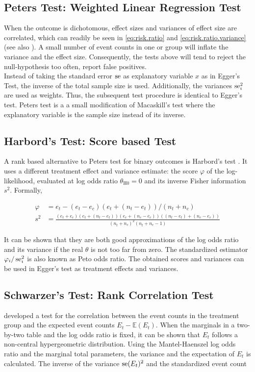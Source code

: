 \documentclass[11pt,a4paper,twoside]{book}\usepackage[]{graphicx}\usepackage[]{color}
\begin{document}
\subsection{Peters Test: Weighted Linear Regression Test} \label{sec:Peter}
When the outcome is dichotomous, effect sizes and variances of effect size are correlated, which can readily be seen in \eqref{eq:risk.ratio} and \eqref{eq:risk.ratio.variance} (see also \cite[120]{meta.w.R}). A small number of event counts in one or group will inflate the variance and the effect size. Consequently, the tests above will tend to reject the null-hypothesis too often, \ie report false positives.\\ 
Instead of taking the standard error $\operatorname{se}$ as explanatory variable $x$ as in Egger's Test, the inverse of the total sample size is used. Additionally, the variances $\operatorname{se}_i^2$ are used as weights. Thus, the subsequent test procedure is identical to Egger's test. Peters test is a a small modification of Macaskill's test where the explanatory variable is the sample size instead of its inverse. \\



\subsection{Harbord's Test: Score based Test} \label{sec:Harbord}
A rank based alternative to Peters test for binary outcomes is Harbord's test \citep{Harbord}.
It uses a different treatment effect and variance estimate: the score $\varphi$ of the log-likelihood, evaluated at log odds ratio $\theta_\textrm{H0} = 0$ and its inverse Fisher information $s^2$. Formally,

\begin{align}
\varphi &= e_t - (e_t - e_c)(e_t + (n_t - e_t))/(n_t + n_c) \label{harbord.score} \\
 s^2 &= \frac{(e_t + e_c)(e_t + (n_t - e_t))(e_c + (n_c - e_c))((n_t - e_t) + (n_c - e_c))}{(n_t + n_c)^2(n_t + n_c - 1)} \label{harbord.variance}
\end{align}

It can be shown that they are both good approximations of the log odds ratio and its variance if the real $\theta$ is not too far from zero. The standardized estimator $\varphi_i/\operatorname{se}_i^2$ is also known as Peto odds ratio. The obtained scores and variances can be used in Egger's test as treatment effects and variances.


\subsection{Schwarzer's Test: Rank Correlation Test} \label{sec:Schwarzer}
\citet{Schwarzer} developed a test for the correlation between the event counts in the treatment group and the expected event counts $E_t - \mathbb{E}(E_t)$. When the marginals in a two-by-two table and the log odds ratio is fixed, it can be shown that $E_t$ follows a non-central hypergeometric distribution. Using the Mantel-Haenszel log odds ratio and the marginal total parameters, the variance and the expectation of $E_t$ is calculated. The inverse of the variance $\operatorname{se}(E_t)^2$ and the standardized event count
\end{document}

